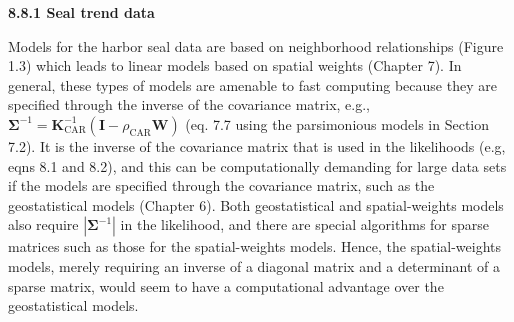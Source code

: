 \documentclass[12pt, titlepage]{article}
\begin{document}
\setcounter{equation}{0}
\renewcommand{\theequation}{R.\arabic{equation}}


%
%

{\large \flushleft \textbf{8.8.1 Seal trend data}}

\vspace{.3cm}

Models for the harbor seal data are based on neighborhood relationships (Figure 1.3) which leads to linear models based on spatial weights (Chapter 7). In general, these types of models are amenable to fast computing because they are specified through the inverse of the covariance matrix, e.g., $\boldsymbol{\Sigma}^{-1} = \mathbf{K}_{\textrm{CAR}}^{-1}(\mathbf{I} - \rho_{\textrm{CAR}}\mathbf{W})$ (eq. 7.7 using the parsimonious models in Section 7.2).  It is the inverse of the covariance matrix that is used in the likelihoods (e.g, eqns 8.1 and 8.2), and this can be computationally demanding for large data sets if the models are specified through the covariance matrix, such as the geostatistical models (Chapter 6).  Both geostatistical and spatial-weights models also require $|\boldsymbol{\Sigma}^{-1}|$ in the likelihood, and there are special algorithms for sparse matrices such as those for the spatial-weights models.  Hence, the spatial-weights models, merely requiring an inverse of a diagonal matrix and a determinant of a sparse matrix, would seem to have a computational advantage over the geostatistical models.
\end{document}
